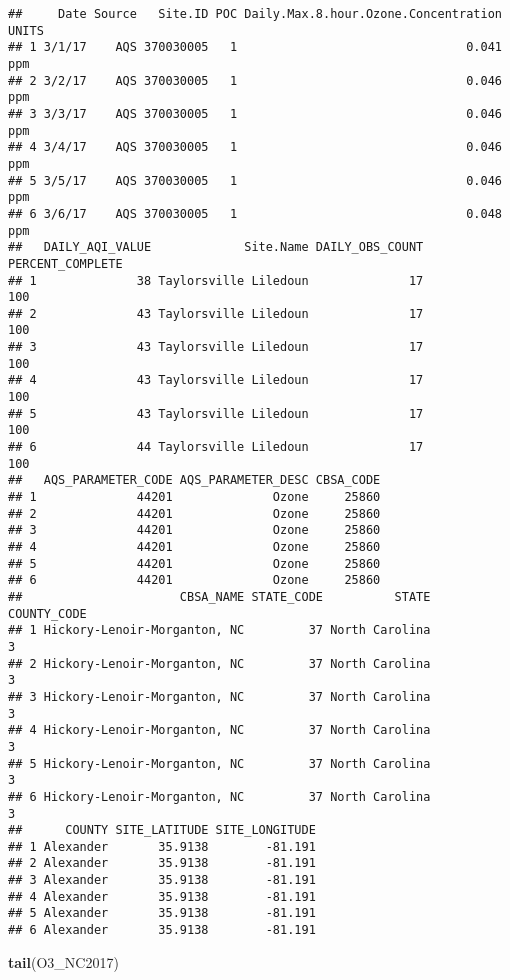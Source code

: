 \documentclass[]{article}
\newenvironment{Shaded}{\begin{snugshade}}{\end{snugshade}}
\newcommand{\KeywordTok}[1]{\textcolor[rgb]{0.13,0.29,0.53}{\textbf{#1}}}
\newcommand{\NormalTok}[1]{#1}
\begin{document}
\begin{verbatim}
##     Date Source   Site.ID POC Daily.Max.8.hour.Ozone.Concentration UNITS
## 1 3/1/17    AQS 370030005   1                                0.041   ppm
## 2 3/2/17    AQS 370030005   1                                0.046   ppm
## 3 3/3/17    AQS 370030005   1                                0.046   ppm
## 4 3/4/17    AQS 370030005   1                                0.046   ppm
## 5 3/5/17    AQS 370030005   1                                0.046   ppm
## 6 3/6/17    AQS 370030005   1                                0.048   ppm
##   DAILY_AQI_VALUE             Site.Name DAILY_OBS_COUNT PERCENT_COMPLETE
## 1              38 Taylorsville Liledoun              17              100
## 2              43 Taylorsville Liledoun              17              100
## 3              43 Taylorsville Liledoun              17              100
## 4              43 Taylorsville Liledoun              17              100
## 5              43 Taylorsville Liledoun              17              100
## 6              44 Taylorsville Liledoun              17              100
##   AQS_PARAMETER_CODE AQS_PARAMETER_DESC CBSA_CODE
## 1              44201              Ozone     25860
## 2              44201              Ozone     25860
## 3              44201              Ozone     25860
## 4              44201              Ozone     25860
## 5              44201              Ozone     25860
## 6              44201              Ozone     25860
##                      CBSA_NAME STATE_CODE          STATE COUNTY_CODE
## 1 Hickory-Lenoir-Morganton, NC         37 North Carolina           3
## 2 Hickory-Lenoir-Morganton, NC         37 North Carolina           3
## 3 Hickory-Lenoir-Morganton, NC         37 North Carolina           3
## 4 Hickory-Lenoir-Morganton, NC         37 North Carolina           3
## 5 Hickory-Lenoir-Morganton, NC         37 North Carolina           3
## 6 Hickory-Lenoir-Morganton, NC         37 North Carolina           3
##      COUNTY SITE_LATITUDE SITE_LONGITUDE
## 1 Alexander       35.9138        -81.191
## 2 Alexander       35.9138        -81.191
## 3 Alexander       35.9138        -81.191
## 4 Alexander       35.9138        -81.191
## 5 Alexander       35.9138        -81.191
## 6 Alexander       35.9138        -81.191
\end{verbatim}

\begin{Shaded}
\begin{Highlighting}[]
\KeywordTok{tail}\NormalTok{(O3_NC2017)}
\end{Highlighting}
\end{Shaded}
\end{document}
